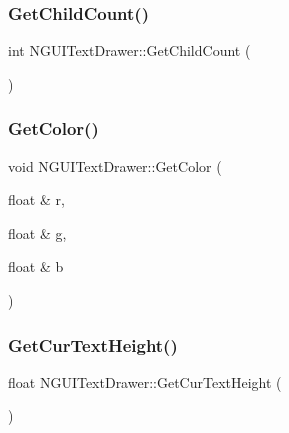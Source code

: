 \hypertarget{class_n_g_u_i_text_drawer_ad5375e3d9b25452e072203230876913c}{}\label{class_n_g_u_i_text_drawer_ad5375e3d9b25452e072203230876913c} 
\subsubsection{\texorpdfstring{Get\+Child\+Count()}{GetChildCount()}}
{\footnotesize\ttfamily int N\+G\+U\+I\+Text\+Drawer\+::\+Get\+Child\+Count (\begin{DoxyParamCaption}{ }\end{DoxyParamCaption})}

\hypertarget{class_n_g_u_i_text_drawer_a71bdcf85de2f25e6ddfe97feade3d64f}{}\label{class_n_g_u_i_text_drawer_a71bdcf85de2f25e6ddfe97feade3d64f} 
\subsubsection{\texorpdfstring{Get\+Color()}{GetColor()}}
{\footnotesize\ttfamily void N\+G\+U\+I\+Text\+Drawer\+::\+Get\+Color (\begin{DoxyParamCaption}\item[{float \&}]{r,  }\item[{float \&}]{g,  }\item[{float \&}]{b }\end{DoxyParamCaption})}

\hypertarget{class_n_g_u_i_text_drawer_aae5146dd7e36bf6611a17436f0f2c5bc}{}\label{class_n_g_u_i_text_drawer_aae5146dd7e36bf6611a17436f0f2c5bc} 
\subsubsection{\texorpdfstring{Get\+Cur\+Text\+Height()}{GetCurTextHeight()}}
{\footnotesize\ttfamily float N\+G\+U\+I\+Text\+Drawer\+::\+Get\+Cur\+Text\+Height (\begin{DoxyParamCaption}{ }\end{DoxyParamCaption})}


